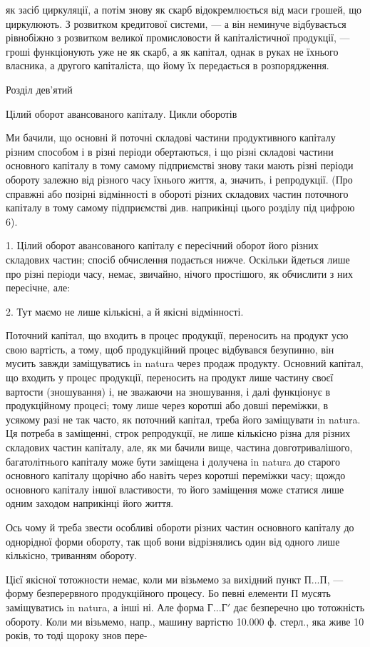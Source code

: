 \parcont{}  %
як засіб циркуляції, а потім знову як скарб відокремлюється від маси
грошей, що циркулюють. З розвитком кредитової системи, — а він неминуче
відбувається рівнобіжно з розвитком великої промисловости й капіталістичної
продукції, — гроші функціонують уже не як скарб, а як капітал,
однак в руках не їхнього власника, а другого капіталіста, що йому
їх передається в розпорядження.

Розділ дев’ятий

Цілий оборот авансованого капіталу. Цикли
оборотів

Ми бачили, що основні й поточні складові частини продуктивного
капіталу різним способом і в різні періоди обертаються, і що різні складові
частини основного капіталу в тому самому підприємстві знову таки
мають різні періоди обороту залежно від різного часу їхнього життя, а,
значить, і репродукції. (Про справжні або позірні відмінності в обороті
різних складових частин поточного капіталу в тому самому підприємстві
див. наприкінці цього розділу під цифрою 6).

1. Цілий оборот авансованого капіталу є пересічний оборот його різних
складових частин; спосіб обчислення подається нижче. Оскільки
йдеться лише про різні періоди часу, немає, звичайно, нічого простішого,
як обчислити з них пересічне, але:

2. Тут маємо не лише кількісні, а й якісні відмінності.

Поточний капітал, що входить в процес продукції, переносить на
продукт усю свою вартість, а тому, щоб продукційний процес відбувався
безупинно, він мусить завжди заміщуватись in natura через продаж
продукту. Основний капітал, що входить у процес продукції, переносить
на продукт лише частину своєї вартости (зношування) і, не зважаючи на
зношування, і далі функціонує в продукційному процесі; тому лише через
коротші або довші переміжки, в усякому разі не так часто, як поточний
капітал, треба його заміщувати in natura. Ця потреба в заміщенні, строк
репродукції, не лише кількісно різна для різних складових частин капіталу,
але, як ми бачили вище, частина довготривалішого, багатолітнього
капіталу може бути заміщена і долучена in natura до старого основного
капіталу щорічно або навіть через коротші переміжки часу; щождо основного
капіталу іншої властивости, то його заміщення може статися лише
одним заходом наприкінці його життя.

Ось чому й треба звести особливі обороти різних частин основного
капіталу до однорідної форми обороту, так щоб вони відрізнялись один
від одного лише кількісно, триванням обороту.

Цієї якісної тотожности немає, коли ми візьмемо за вихідний пункт
$П... П$, — форму безперервного продукційного процесу. Бо певні елементи
П мусять заміщуватись in natura, а інші ні. Але форма $Г... Г'$ дає безперечно
цю тотожність обороту. Коли ми візьмемо, напр., машину вартістю
10.000 ф. стерл., яка живе 10 років, то тоді щороку знов пере-
\parbreak{}  %
